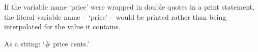 If the variable name `price' were wrapped in double quotes in a print
statement, the literal variable name -- `price' -- would be printed
rather than being interpolated for the value it contains.

As a string: `# price cents.'
